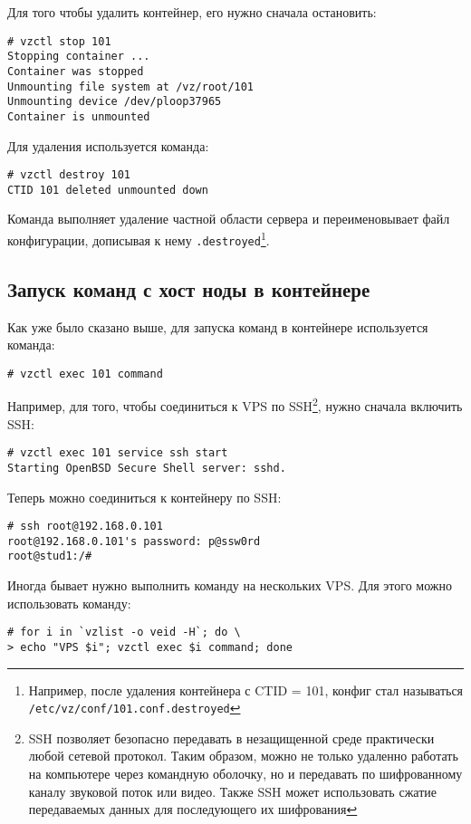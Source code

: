 Для того чтобы удалить контейнер, его нужно сначала остановить:
\begin{lstlisting}
# vzctl stop 101
Stopping container ...
Container was stopped
Unmounting file system at /vz/root/101
Unmounting device /dev/ploop37965
Container is unmounted
\end{lstlisting}

Для удаления используется команда:
\begin{lstlisting}
# vzctl destroy 101
CTID 101 deleted unmounted down
\end{lstlisting}

Команда выполняет удаление частной области сервера и переименовывает файл конфигурации, дописывая к нему \texttt{.destroyed}\footnote{Например, после удаления контейнера с CTID = 101, конфиг стал называться \texttt{/etc/vz/conf/101.conf.destroyed}}.

\subsection{Запуск команд с хост ноды в контейнере}
Как уже было сказано выше, для запуска команд в контейнере используется команда:
\begin{lstlisting}
# vzctl exec 101 command
\end{lstlisting}

Например, для того, чтобы соединиться к VPS по SSH\footnote{SSH позволяет безопасно передавать в незащищенной среде практически любой сетевой протокол. Таким образом, можно не только удаленно работать на компьютере через командную оболочку, но и передавать по шифрованному каналу звуковой поток или видео. Также SSH может использовать сжатие передаваемых данных для последующего их шифрования}, нужно сначала включить SSH:
\begin{lstlisting}
# vzctl exec 101 service ssh start
Starting OpenBSD Secure Shell server: sshd.
\end{lstlisting}

Теперь можно соединиться к контейнеру по SSH:
\begin{lstlisting}
# ssh root@192.168.0.101
root@192.168.0.101's password: p@ssw0rd
root@stud1:/# 
\end{lstlisting}

Иногда бывает нужно выполнить команду на нескольких VPS.
Для этого можно использовать команду:
\begin{lstlisting}
# for i in `vzlist -o veid -H`; do \
> echo "VPS $i"; vzctl exec $i command; done
\end{lstlisting}

